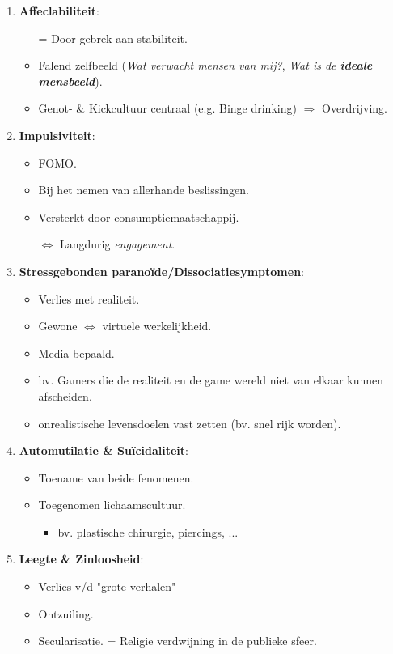 \begin{enumerate}
\begin{itemize}
	\end{itemize}
	\item \textbf{Affeclabiliteit}:
	\begin{itemize}
		\item[=] Door gebrek aan stabiliteit.
		\item Falend zelfbeeld (\textit{Wat verwacht mensen van mij?}, \textit{Wat is de \textbf{ideale mensbeeld}}).
		\item Genot- \& Kickcultuur centraal (e.g. Binge drinking) $\Rightarrow$ Overdrijving.
	\end{itemize}
	\item \textbf{Impulsiviteit}:
	\begin{itemize}
		\item FOMO.
		\item Bij het nemen van allerhande beslissingen.
		\item Versterkt door consumptiemaatschappij.
		\item[$\Leftrightarrow$] Langdurig \textit{engagement}.
	\end{itemize}
	\item \textbf{Stressgebonden parano\"ide/Dissociatiesymptomen}:
	\begin{itemize}
		\item Verlies met realiteit.
		\item Gewone $\Leftrightarrow$ virtuele werkelijkheid.
		\item Media bepaald.
		\item bv. Gamers die de realiteit en de game wereld niet van elkaar kunnen afscheiden.
		\item onrealistische levensdoelen vast zetten (bv. snel rijk worden).
	\end{itemize}
	\item \textbf{Automutilatie \& Su\"icidaliteit}:
	\begin{itemize}
		\item Toename van beide fenomenen.
		\item Toegenomen lichaamscultuur.
		\begin{itemize}
			\item bv. plastische chirurgie, piercings, ...
		\end{itemize}
	\end{itemize}
	\item \textbf{Leegte \& Zinloosheid}:
	\begin{itemize}
		\item Verlies v/d "grote verhalen"
		\item Ontzuiling.
		\item Secularisatie. = Religie verdwijning in de publieke sfeer.
	\end{itemize}
\end{enumerate}


